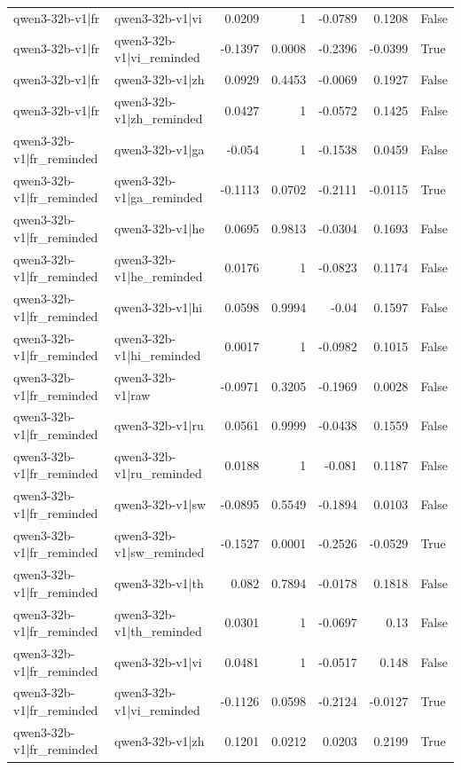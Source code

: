 \begin{table}
\begin{tabular}{l l r r r r l}
qwen3-32b-v1|fr & qwen3-32b-v1|vi & 0.0209 & 1 & -0.0789 & 0.1208 & False \\
qwen3-32b-v1|fr & qwen3-32b-v1|vi_reminded & -0.1397 & 0.0008 & -0.2396 & -0.0399 & True \\
qwen3-32b-v1|fr & qwen3-32b-v1|zh & 0.0929 & 0.4453 & -0.0069 & 0.1927 & False \\
qwen3-32b-v1|fr & qwen3-32b-v1|zh_reminded & 0.0427 & 1 & -0.0572 & 0.1425 & False \\
qwen3-32b-v1|fr_reminded & qwen3-32b-v1|ga & -0.054 & 1 & -0.1538 & 0.0459 & False \\
qwen3-32b-v1|fr_reminded & qwen3-32b-v1|ga_reminded & -0.1113 & 0.0702 & -0.2111 & -0.0115 & True \\
qwen3-32b-v1|fr_reminded & qwen3-32b-v1|he & 0.0695 & 0.9813 & -0.0304 & 0.1693 & False \\
qwen3-32b-v1|fr_reminded & qwen3-32b-v1|he_reminded & 0.0176 & 1 & -0.0823 & 0.1174 & False \\
qwen3-32b-v1|fr_reminded & qwen3-32b-v1|hi & 0.0598 & 0.9994 & -0.04 & 0.1597 & False \\
qwen3-32b-v1|fr_reminded & qwen3-32b-v1|hi_reminded & 0.0017 & 1 & -0.0982 & 0.1015 & False \\
qwen3-32b-v1|fr_reminded & qwen3-32b-v1|raw & -0.0971 & 0.3205 & -0.1969 & 0.0028 & False \\
qwen3-32b-v1|fr_reminded & qwen3-32b-v1|ru & 0.0561 & 0.9999 & -0.0438 & 0.1559 & False \\
qwen3-32b-v1|fr_reminded & qwen3-32b-v1|ru_reminded & 0.0188 & 1 & -0.081 & 0.1187 & False \\
qwen3-32b-v1|fr_reminded & qwen3-32b-v1|sw & -0.0895 & 0.5549 & -0.1894 & 0.0103 & False \\
qwen3-32b-v1|fr_reminded & qwen3-32b-v1|sw_reminded & -0.1527 & 0.0001 & -0.2526 & -0.0529 & True \\
qwen3-32b-v1|fr_reminded & qwen3-32b-v1|th & 0.082 & 0.7894 & -0.0178 & 0.1818 & False \\
qwen3-32b-v1|fr_reminded & qwen3-32b-v1|th_reminded & 0.0301 & 1 & -0.0697 & 0.13 & False \\
qwen3-32b-v1|fr_reminded & qwen3-32b-v1|vi & 0.0481 & 1 & -0.0517 & 0.148 & False \\
qwen3-32b-v1|fr_reminded & qwen3-32b-v1|vi_reminded & -0.1126 & 0.0598 & -0.2124 & -0.0127 & True \\
qwen3-32b-v1|fr_reminded & qwen3-32b-v1|zh & 0.1201 & 0.0212 & 0.0203 & 0.2199 & True \\

\end{tabular}
\end{table}
